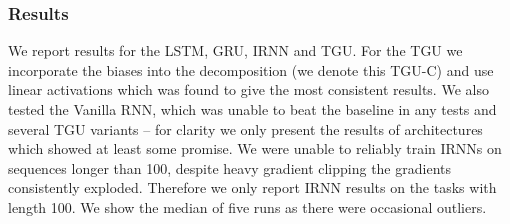 \subsubsection{Results}
We report results for the LSTM, GRU, IRNN and TGU. For the TGU we incorporate the biases into
the decomposition (we denote this TGU-C) and use linear activations which was found to give the
most consistent results. We also tested the Vanilla RNN, which was unable to beat the baseline in
any tests and several TGU variants -- for clarity we only present the results of architectures which
showed at least some promise. We were unable to reliably train IRNNs on sequences longer than
100, despite heavy gradient clipping the gradients
consistently exploded. Therefore we only report IRNN results on
the tasks with length 100. We show the median of five runs as there were occasional outliers.

